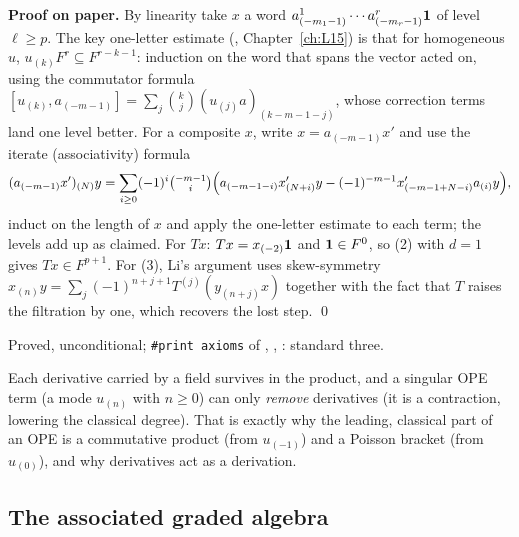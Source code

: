 \textbf{Proof on paper.} By linearity take $x$ a word $a^1_{(-m_1-1)}\cdots a^r_{(-m_r-1)}\mathbf{1}$ of
level $\ell\ge p$. The key one-letter estimate (, Chapter~\ref{ch:L15}) is that for
homogeneous $u$, $u_{(k)}F^r\subseteq F^{r-k-1}$: induction on the word that spans the vector acted on,
using the commutator formula $[u_{(k)},a_{(-m-1)}] = \sum_j\binom kj(u_{(j)}a)_{(k-m-1-j)}$, whose
correction terms land one level better. For a composite $x$, write $x = a_{(-m-1)}x'$ and use the iterate
(associativity) formula
\begin{equation*}
(a_{(-m-1)}x')_{(N)}y = \sum_{i\ge0}(-1)^i\tbinom{-m-1}{i}\Bigl(a_{(-m-1-i)}x'_{(N+i)}y-(-1)^{-m-1}x'_{(-m-1+N-i)}a_{(i)}y\Bigr),
\end{equation*}
induct on the length of $x$ and apply the one-letter estimate to each term; the levels add up as claimed.
For $Tx$: $Tx = x_{(-2)}\mathbf{1}$ and $\mathbf{1}\in F^0$, so (2) with $d=1$ gives $Tx\in F^{p+1}$. For
(3), Li's argument uses skew-symmetry $x_{(n)}y = \sum_j(-1)^{n+j+1}T^{(j)}(y_{(n+j)}x)$ together with the
fact that $T$ raises the filtration by one, which recovers the lost step. \qed

\begin{status}
Proved, unconditional; \texttt{\#print axioms} of \allowbreak{}\allowbreak{}\allowbreak{},
\allowbreak{}\allowbreak{}\allowbreak{}\allowbreak{}\allowbreak{}, \allowbreak{}\allowbreak{}\allowbreak{}\allowbreak{}: standard three.
\end{status}

\begin{physics}
Each derivative carried by a field survives in the product, and a singular OPE term (a mode $u_{(n)}$ with
$n\ge0$) can only \emph{remove} derivatives (it is a contraction, lowering the classical degree). That is
exactly why the leading, classical part of an OPE is a commutative product (from $u_{(-1)}$) and a Poisson
bracket (from $u_{(0)}$), and why derivatives act as a derivation.
\end{physics}

\subsection{The associated graded algebra}

